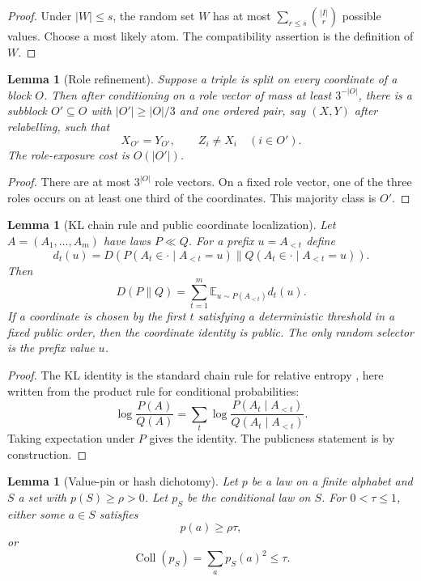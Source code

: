 \documentclass[11pt]{article}
\newtheorem{lemma}[theorem]{Lemma}
\newcommand{\EE}{\mathbb E}
\newcommand{\Coll}{\operatorname{Coll}}
\begin{document}
\begin{proof}
Under $|W|\le s$, the random set $W$ has at most
$\sum_{r\le s}\binom{|I|}{r}$ possible values.  Choose a most likely atom.
The compatibility assertion is the definition of $W$.
\end{proof}

\begin{lemma}[Role refinement]
\label{lem:role-refinement}
Suppose a triple is split on every coordinate of a block $O$.  Then after
conditioning on a role vector of mass at least $3^{-|O|}$, there is a subblock
$O'\subseteq O$ with $|O'|\ge |O|/3$ and one ordered pair, say $(X,Y)$ after
relabelling, such that
\[
  X_{O'}=Y_{O'},\qquad Z_i\ne X_i\quad (i\in O').
\]
The role-exposure cost is $O(|O'|)$.
\end{lemma}

\begin{proof}
There are at most $3^{|O|}$ role vectors.  On a fixed role vector, one of the
three roles occurs on at least one third of the coordinates.  This majority
class is $O'$.
\end{proof}

\begin{lemma}[KL chain rule and public coordinate localization]
\label{lem:kl-chain}
Let $A=(A_1,\ldots,A_m)$ have laws $P\ll Q$.  For a prefix $u=A_{<t}$ define
\[
  d_t(u)=D(P(A_t\in\cdot\mid A_{<t}=u)\|
          Q(A_t\in\cdot\mid A_{<t}=u)).
\]
Then
\[
  D(P\|Q)=\sum_{t=1}^m
    \EE_{u\sim P(A_{<t})} d_t(u).
\]
If a coordinate is chosen by the first $t$ satisfying a deterministic
threshold in a fixed public order, then the coordinate identity is public.
The only random selector is the prefix value $u$.
\end{lemma}

\begin{proof}
The KL identity is the standard chain rule for relative entropy
\cite{KullbackLeibler51,CoverThomas06,CsiszarKorner11}, here written from the
product rule for conditional probabilities:
\[
  \log\frac{P(A)}{Q(A)}
  =
  \sum_t
  \log
  \frac{P(A_t\mid A_{<t})}{Q(A_t\mid A_{<t})}.
\]
Taking expectation under $P$ gives the identity.  The publicness statement is
by construction.
\end{proof}

\begin{lemma}[Value-pin or hash dichotomy]
\label{lem:fibre-hash}
Let $p$ be a law on a finite alphabet and $S$ a set with $p(S)\ge\rho>0$.
Let $p_S$ be the conditional law on $S$.  For $0<\tau\le 1$, either some
$a\in S$ satisfies
\[
  p(a)\ge \rho\tau,
\]
or
\[
  \Coll(p_S)=\sum_a p_S(a)^2\le \tau.
\]
\end{lemma}
\end{document}
